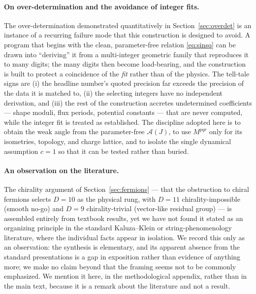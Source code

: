 \documentclass[11pt]{article}
\theoremstyle{plain}
\theoremstyle{definition}
\newcommand{\cA}{\mathcal{A}}
\begin{document}
\paragraph{On over-determination and the avoidance of integer fits.}
The over-determination demonstrated quantitatively in
Section~\ref{sec:overdet} is an instance of a recurring failure mode that
this construction is designed to avoid. A program that begins with the clean,
parameter-free relation \eqref{eq:sinsq} can be drawn into ``deriving'' it
from a multi-integer geometric family that reproduces it to many digits; the
many digits then become load-bearing, and the construction is built to
protect a coincidence of the \emph{fit} rather than of the physics. The
tell-tale signs are (i) the headline number's quoted precision far exceeds
the precision of the data it is matched to, (ii) the selecting integers have
no independent derivation, and (iii) the rest of the construction accretes
undetermined coefficients --- shape moduli, flux periods, potential
constants --- that are never computed, while the integer fit is treated as
established. The discipline adopted here is to obtain the weak angle from the
parameter-free $\cA(J)$, to use $M^{pqr}$ only for its isometries, topology,
and charge lattice, and to isolate the single dynamical assumption $c=1$ so
that it can be tested rather than buried.

\paragraph{An observation on the literature.}
The chirality argument of Section~\ref{sec:fermions} --- that the obstruction
to chiral fermions selects $D=10$ as the physical rung, with $D=11$
chirality-impossible (smooth no-go) and $D=9$ chirality-trivial (vector-like
residual group) --- is assembled entirely from textbook results, yet we have
not found it stated as an organizing principle in the standard Kaluza--Klein
or string-phenomenology literature, where the individual facts appear in
isolation. We record this only as an observation: the synthesis is
elementary, and its apparent absence from the standard presentations is a
gap in exposition rather than evidence of anything more; we make no claim
beyond that the framing seems not to be commonly emphasized. We mention it
here, in the methodological appendix, rather than in the main text, because it
is a remark about the literature and not a result.
\end{document}
